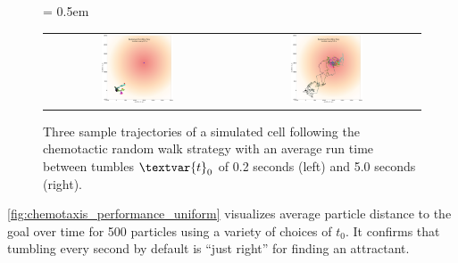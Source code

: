 \begin{figure}[h]
\centering
\mySfFamily
\tabcolsep = 0.5em
\begin{tabular}{c c}
\includegraphics[width = 0.4\textwidth]{../images/chemotaxis_traj_0.2_uniform.png} & \includegraphics[width = 0.4\textwidth]{../images/chemotaxis_traj_5.0_uniform.png}
\end{tabular}
\caption{Three sample trajectories of a simulated cell following the chemotactic random walk strategy with an average run time between tumbles $\textvar{t}_\text{0}$ of 0.2 seconds (left) and 5.0 seconds (right).}
\label{fig:chemotaxis_traj_low_high_tumbling}
\end{figure}

\autoref{fig:chemotaxis_performance_uniform} visualizes average particle distance to the goal over time for 500 particles using a variety of choices of $t_0$. It confirms that tumbling every second by default is ``just right'' for finding an attractant.\\

